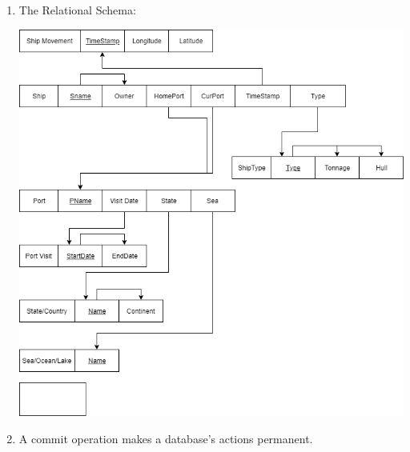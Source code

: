 \documentclass[12pt]{article}
\begin{document}
\begin{enumerate}
	\item The Relational Schema: \\
	\begin{center}
			\includegraphics[scale=.5]{43}
	\end{center} 
	
	\item A commit operation makes a database's actions permanent.

\end{enumerate}
\end{document}
